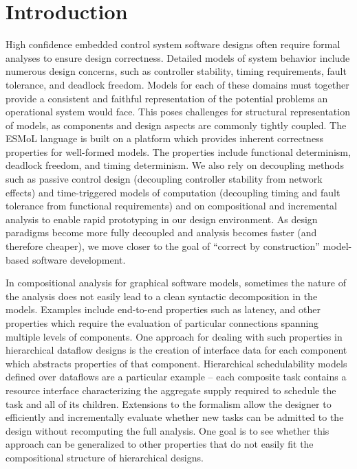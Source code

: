 \section{Introduction}

High confidence embedded control system software designs often require formal 
analyses to ensure design correctness.  Detailed models of system behavior 
include numerous design concerns, such as controller stability, timing 
requirements, fault tolerance, and deadlock freedom.  Models for each of these
domains must together provide a consistent and faithful representation of the
potential problems an operational system would face.  This poses challenges 
for structural representation of models, as components and design
aspects are commonly tightly coupled.  The ESMoL language is built on a platform which provides inherent correctness properties for well-formed models.  The properties include functional determinism, deadlock freedom, and timing determinism.  We also rely on decoupling
methods such as passive control design (decoupling controller stability from
network effects) and time-triggered models of computation (decoupling timing 
and fault tolerance from functional requirements) and on compositional 
and incremental analysis to enable rapid prototyping in our design environment.  As design paradigms become more fully decoupled and analysis becomes faster (and therefore cheaper), we move closer to the goal of ``correct by construction'' model-based software 
development.

In compositional analysis for graphical software models, sometimes the nature of the analysis does not easily lead to a clean syntactic decomposition in the models.  Examples include end-to-end properties such as latency, and other properties which require the evaluation of particular connections spanning multiple levels of components.  One approach for dealing with such properties in hierarchical dataflow designs is the creation of interface data for each component which abstracts properties of that component.  Hierarchical schedulability models defined over dataflows are a particular example\cite{sched:shin} -- each composite task contains a resource interface characterizing the aggregate supply required to schedule the task and all of its children.  Extensions to the formalism allow the designer to efficiently and incrementally evaluate whether new tasks can be admitted to the design without recomputing the full analysis\cite{sched:easwaran}.  One goal is to see whether this approach can be generalized to other properties that do not easily fit the compositional structure of hierarchical designs.
 
